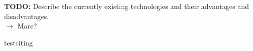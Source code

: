 \textbf{TODO:} Describe the currently existing technologies and their advantages and disadvantages. \\ 
$\rightarrow$ Marc?

testciting \cite{McIntosh:2016:EPH:2858036.2858093}